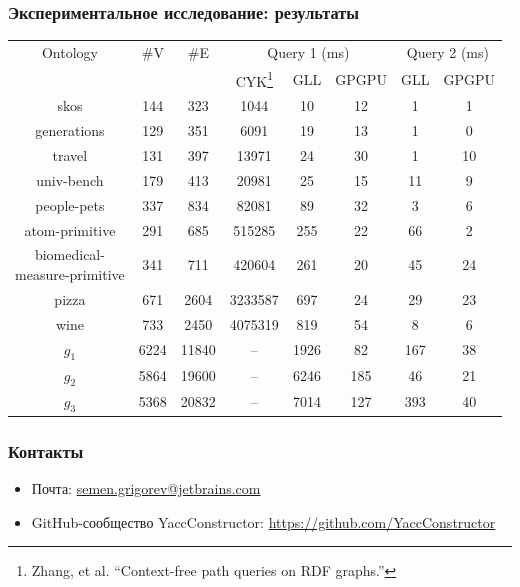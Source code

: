 \documentclass[xcolor=table,aspectratio=169]{beamer}
\begin{document}
\begin{frame}[fragile]
\transwipe[direction=90]
\frametitle{Экспериментальное исследование: результаты}
\centering
{}
\begin{tabular}{  c | c | c | c | c | c | c | c }
Ontology & \#V & \#E & \multicolumn{3}{c|}{Query 1 (ms)} & \multicolumn{2}{c}{Query 2 (ms)} \\
\cline{4-8}
& & & CYK\footnote{Zhang, et al. ``Context-free path queries on RDF graphs.''} & GLL & GPGPU & GLL & GPGPU \\
\hline 
\hline
skos        & 144  & 323   & 1044    & 10   & 12  & 1   & 1 \\
generations & 129  & 351   & 6091    & 19   & 13  & 1   & 0 \\
travel      & 131  & 397   & 13971   & 24   & 30  & 1   & 10 \\
univ-bench  & 179  & 413   & 20981   & 25   & 15  & 11  & 9 \\
people-pets & 337  & 834   & 82081   & 89   & 32  & 3   & 6 \\
atom-primitive 
            & 291  & 685   & 515285  & 255  & 22  & 66  & 2 \\
\shortstack{biomedical- \\ measure-primitive} 
            & 341  & 711   & 420604  & 261  & 20  & 45  & 24 \\
pizza       & 671  & 2604  & 3233587 & 697  & 24  & 29  & 23 \\
wine        & 733  & 2450  & 4075319 & 819  & 54  & 8   & 6 \\
$g_{1}$     & 6224 & 11840 & --      & 1926 & 82  & 167 & 38\\
$g_{2}$     & 5864 & 19600 & --      & 6246 & 185 & 46  & 21\\
$g_{3}$     & 5368 & 20832 & --      & 7014 & 127 & 393 & 40\\

\end{tabular}

\end{frame}
        
\begin{frame}
\transwipe[direction=90]
\frametitle{Контакты}
\begin{itemize}
  \item Почта: \url{semen.grigorev@jetbrains.com}
  \item GitHub-сообщество YaccConstructor: \url{https://github.com/YaccConstructor}
\end{itemize}
\end{frame}
\end{document}
